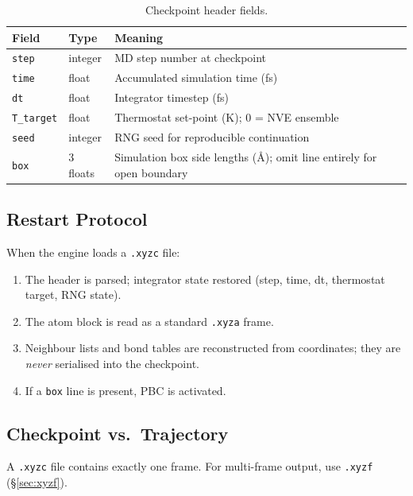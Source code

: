 \documentclass[12pt, a4paper, oneside]{article}
\begin{document}
\begin{table}[htbp]
  \centering
  \caption{Checkpoint header fields.}
  \label{tab:xyzc_header}
  \begin{tabular}{llp{7.5cm}}
    \toprule
    Field & Type & Meaning \\
    \midrule
    \texttt{step}      & integer & MD step number at checkpoint \\
    \texttt{time}      & float   & Accumulated simulation time (fs) \\
    \texttt{dt}        & float   & Integrator timestep (fs) \\
    \texttt{T\_target} & float   & Thermostat set-point (K); 0 = NVE ensemble \\
    \texttt{seed}      & integer & RNG seed for reproducible continuation \\
    \texttt{box}       & 3 floats & Simulation box side lengths (\AA);
                                    omit line entirely for open boundary \\
    \bottomrule
  \end{tabular}
\end{table}

\subsection{Restart Protocol}

When the engine loads a \texttt{.xyzc} file:

\begin{enumerate}
  \item The header is parsed; integrator state restored (step, time, dt,
        thermostat target, RNG state).
  \item The atom block is read as a standard \texttt{.xyza} frame.
  \item Neighbour lists and bond tables are reconstructed from coordinates;
        they are \emph{never} serialised into the checkpoint.
  \item If a \texttt{box} line is present, PBC is activated.
\end{enumerate}

\subsection{Checkpoint vs.\ Trajectory}

A \texttt{.xyzc} file contains exactly one frame.  For multi-frame
output, use \texttt{.xyzf} (\S\ref{sec:xyzf}).
\end{document}
